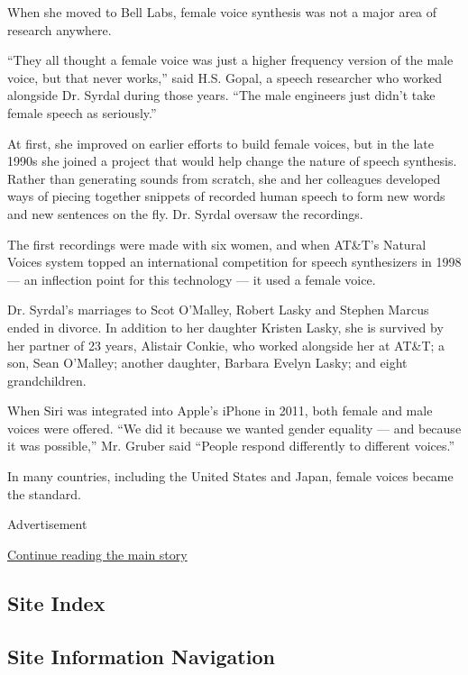 When she moved to Bell Labs, female voice synthesis was not a major area
of research anywhere.

``They all thought a female voice was just a higher frequency version of
the male voice, but that never works,'' said H.S. Gopal, a speech
researcher who worked alongside Dr. Syrdal during those years. ``The
male engineers just didn't take female speech as seriously.''

At first, she improved on earlier efforts to build female voices, but in
the late 1990s she joined a project that would help change the nature of
speech synthesis. Rather than generating sounds from scratch, she and
her colleagues developed ways of piecing together snippets of recorded
human speech to form new words and new sentences on the fly. Dr. Syrdal
oversaw the recordings.

The first recordings were made with six women, and when AT\&T's Natural
Voices system topped an international competition for speech
synthesizers in 1998 --- an inflection point for this technology --- it
used a female voice.

Dr. Syrdal's marriages to Scot O'Malley, Robert Lasky and Stephen Marcus
ended in divorce. In addition to her daughter Kristen Lasky, she is
survived by her partner of 23 years, Alistair Conkie, who worked
alongside her at AT\&T; a son, Sean O'Malley; another daughter, Barbara
Evelyn Lasky; and eight grandchildren.

When Siri was integrated into Apple's iPhone in 2011, both female and
male voices were offered. ``We did it because we wanted gender equality
--- and because it was possible,'' Mr. Gruber said ``People respond
differently to different voices.''

In many countries, including the United States and Japan, female voices
became the standard.

Advertisement

\protect\hyperlink{after-bottom}{Continue reading the main story}

\hypertarget{site-index}{%
\subsection{Site Index}\label{site-index}}

\hypertarget{site-information-navigation}{%
\subsection{Site Information
Navigation}\label{site-information-navigation}}

